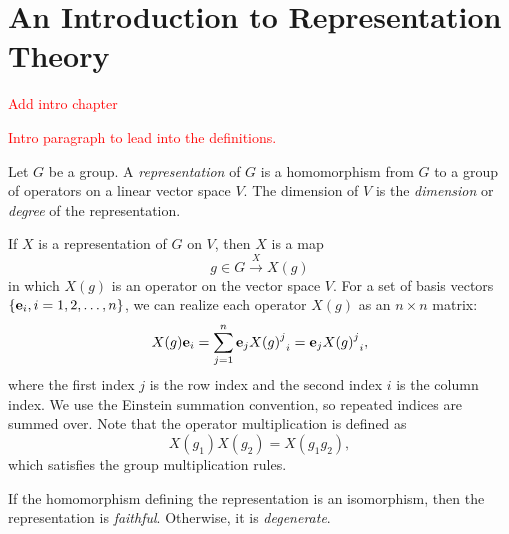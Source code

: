 \chapter{An Introduction to Representation Theory}\label{ch:rep_background}


\textcolor{red}{Add intro chapter}

\textcolor{red}{Intro paragraph to lead into the definitions.}

\begin{definition}
    Let $G$ be a group. A \textit{representation} of $G$ is a homomorphism from $G$ to a group of operators on a linear vector space $V$. The dimension of $V$ is the \textit{dimension} or \textit{degree} of the representation.
\end{definition}

If $X$ is a representation of $G$ on $V$, then $X$ is a map
\begin{equation}
    g\in G\xrightarrow{X} X(g)
\end{equation}
in which $X(g)$ is an operator on the vector space $V$. For a set of basis vectors $\{\mathbf{e}_i,i=1,2,\dots,n\}$, we can realize each operator $X(g)$ as an $n\times n$ matrix:
\begin{equation}
    X(g)\mathbf{e}_i = \sum_{j=1}^n \mathbf{e}_j{{X(g)}^j}_i = \mathbf{e}_j{{X(g)}^j}_i,
\end{equation}
where the first index $j$ is the row index and the second index $i$ is the column index. We use the Einstein summation convention, so repeated indices are summed over. Note that the operator multiplication is defined as
\begin{equation}
    X(g_1)X(g_2) = X(g_1g_2),
\end{equation}
which satisfies the group multiplication rules.

\begin{definition}
    If the homomorphism defining the representation is an isomorphism, then the representation is \textit{faithful}. Otherwise, it is \textit{degenerate}.
\end{definition}

